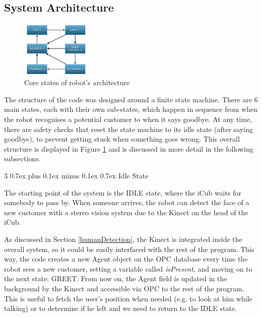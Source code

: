 \documentclass[conference]{IEEEtran}
\makeatletter
\def\subsubsection{\@startsection{subsubsection}%
	{3}%
	{\z@}%
	{0.7ex plus 0.1ex minus 0.1ex}%
	{0.7ex}%
	{\normalfont\normalsize\itshape}}%
\makeatother
\begin{document}
\subsection{System Architecture} \label{Architecture}

\begin{figure}[h]
	\centering
	\includegraphics[width=0.3\textwidth]{figures/StateMachine}
	\caption{Core states of robot's architecture}
	\label{fig:stateMachine}
\end{figure}


The structure of the code was designed around a finite state machine. There are 6 main states, each with their own sub-states, which happen in sequence from when the robot recognises a potential customer to when it says goodbye. At any time, there are safety checks that reset the state machine to its idle state (after saying goodbye), to prevent getting stuck when something goes wrong. This overall structure is displayed in Figure \ref{fig:stateMachine} and is discussed in more detail in the following subsections. 

\subsubsection{Idle State}

The starting point of the system is the IDLE state, where the iCub waits for somebody to pass by. When someone arrives, the robot can detect the face of a new customer with a stereo vision system due to the Kinect on the head of the iCub.

As discussed in Section \ref{humanDetection}, the Kinect is integrated inside the overall system, so it could be easily interfaced with the rest of the program. This way, the code creates a new Agent object on the OPC database every time the robot sees a new customer, setting a variable called \textit{isPresent}, and moving on to the next state: GREET. From now on, the Agent field is updated in the background by the Kinect and accessible via OPC to the rest of the program. This is useful to fetch the user's position when needed (e.g. to look at him while talking) or to determine if he left and we need to return to the IDLE state. 
\end{document}
